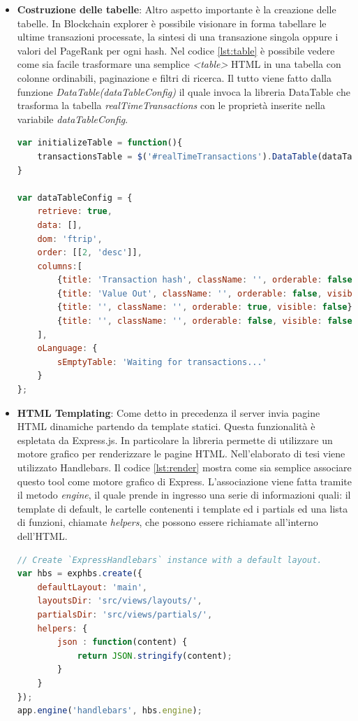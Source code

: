 \begin{itemize}
\item \textbf{Costruzione delle tabelle}: Altro aspetto importante è la creazione delle tabelle. In Blockchain explorer è possibile visionare in forma tabellare le ultime transazioni processate, la sintesi di una transazione singola oppure i valori del PageRank per ogni hash. Nel codice \ref{lst:table}  è possibile vedere come sia facile trasformare una semplice \textit{<table>} HTML in una tabella con colonne ordinabili, paginazione e filtri di ricerca. Il tutto viene fatto dalla funzione \textit{DataTable(dataTableConfig)} il quale invoca la libreria DataTable che trasforma la tabella \textit{realTimeTransactions} con le proprietà inserite nella variabile \textit{dataTableConfig}.

\begin{lstlisting}[language=Javascript, label=lst:table, caption={Utilizzo DataTable.}]
var initializeTable = function(){
    transactionsTable = $('#realTimeTransactions').DataTable(dataTableConfig);
}

var dataTableConfig = {
    retrieve: true,
    data: [],
    dom: 'ftrip',
    order: [[2, 'desc']],
    columns:[
        {title: 'Transaction hash', className: '', orderable: false, visible: true},
        {title: 'Value Out', className: '', orderable: false, visible: true},
        {title: '', className: '', orderable: true, visible: false},
        {title: '', className: '', orderable: false, visible: false}
    ],
    oLanguage: {
        sEmptyTable: 'Waiting for transactions...'
    }
};
\end{lstlisting}

\item \textbf{HTML Templating}: Come detto in precedenza il server invia pagine HTML dinamiche partendo da template statici. Questa funzionalità è espletata da Express.js. In particolare la libreria permette di utilizzare un motore grafico per renderizzare le pagine HTML. Nell'elaborato di tesi viene utilizzato Handlebars. Il codice \ref{lst:render} mostra come sia semplice associare questo tool come motore grafico di Express. L'associazione viene fatta tramite il metodo \textit{engine}, il quale prende in ingresso una serie di informazioni quali: il template di default, le cartelle contenenti i template ed i partials ed una lista di funzioni, chiamate \textit{helpers}, che possono essere richiamate all'interno dell'HTML. 

\begin{lstlisting}[language=Javascript, label=lst:render, caption={Associazione Express-Handelbars.}]
// Create `ExpressHandlebars` instance with a default layout.
var hbs = exphbs.create({
    defaultLayout: 'main',
    layoutsDir: 'src/views/layouts/',
    partialsDir: 'src/views/partials/',
    helpers: {
        json : function(content) {
            return JSON.stringify(content);
        }
    }
});
app.engine('handlebars', hbs.engine);
\end{lstlisting}


\end{itemize}
